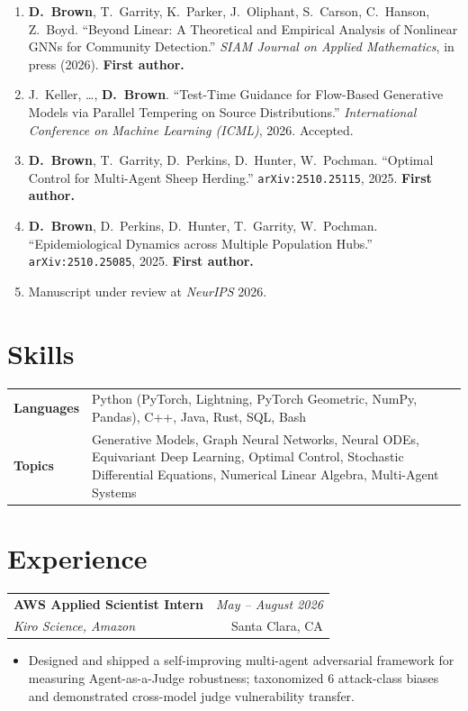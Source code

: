\documentclass[letterpaper,11pt]{article}
\makeatletter
\newcommand{\entry}[4]{%
  \noindent\begin{tabularx}{\textwidth}{@{}X r@{}}
    \textbf{#1} & \textit{#2} \\
    \textit{#3} & #4 \\
  \end{tabularx}\vspace{2pt}
}
\makeatother
\begin{document}
\begin{enumerate}
  \item \textbf{D.~Brown}, T.~Garrity, K.~Parker, J.~Oliphant, S.~Carson, C.~Hanson, Z.~Boyd. ``Beyond Linear: A Theoretical and Empirical Analysis of Nonlinear GNNs for Community Detection.'' \textit{SIAM Journal on Applied Mathematics}, in press (2026). \textbf{First author.}
  \item J.~Keller, \ldots, \textbf{D.~Brown}. ``Test-Time Guidance for Flow-Based Generative Models via Parallel Tempering on Source Distributions.'' \textit{International Conference on Machine Learning (ICML)}, 2026. Accepted.
  \item \textbf{D.~Brown}, T.~Garrity, D.~Perkins, D.~Hunter, W.~Pochman. ``Optimal Control for Multi-Agent Sheep Herding.'' \texttt{arXiv:2510.25115}, 2025. \textbf{First author.}
  \item \textbf{D.~Brown}, D.~Perkins, D.~Hunter, T.~Garrity, W.~Pochman. ``Epidemiological Dynamics across Multiple Population Hubs.'' \texttt{arXiv:2510.25085}, 2025. \textbf{First author.}
  \item Manuscript under review at \textit{NeurIPS} 2026.
\end{enumerate}

\section*{Skills}

\noindent\begin{tabularx}{\textwidth}{@{}l X@{}}
  \textbf{Languages} & Python (PyTorch, Lightning, PyTorch Geometric, NumPy, Pandas), C++, Java, Rust, SQL, Bash \\
  \textbf{Topics}    & Generative Models, Graph Neural Networks, Neural ODEs, Equivariant Deep Learning, Optimal Control, Stochastic Differential Equations, Numerical Linear Algebra, Multi-Agent Systems \\
\end{tabularx}

\section*{Experience}

\entry{AWS Applied Scientist Intern}{May -- August 2026}
      {Kiro Science, Amazon}{Santa Clara, CA}
\vspace{-4pt}
\begin{itemize}
  \item Designed and shipped a self-improving multi-agent adversarial framework for measuring Agent-as-a-Judge robustness; taxonomized 6 attack-class biases and demonstrated cross-model judge vulnerability transfer.
\end{itemize}
\end{document}
